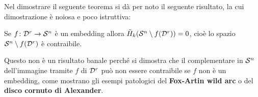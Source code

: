 Nel dimostrare il seguente teorema si dà per noto il seguente risultato, la cui
dimostrazione è noiosa e poco istruttiva:
\begin{lemma}
  Se $ f \colon \mathcal{D}^{r} \to \mathcal{S}^{n} $ è un embedding allora
  $ \tilde{H}_k(\mathcal{S}^{n} \setminus f(\mathcal{D}^{r})) = 0 $, cioè lo spazio
  $ \mathcal{S}^{n} \setminus f(\mathcal{D}^{r}) $ è contraibile.
\end{lemma}
\begin{osservation}
  Questo non è un risultato banale perché si dimostra che il complementare in
  $ \mathcal{S}^{n} $ dell'immagine tramite $ f $ di $ \mathcal{D}^{r} $ può non essere
  contraibile se $ f $ non è un embedding, come mostrano gli esempi patologici
  del \textbf{Fox-Artin wild arc} o del \textbf{disco
    cornuto di Alexander}.
\end{osservation}

